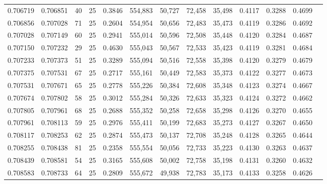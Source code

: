 \begin{tabular}{rrrrrrrrrrrrr}
0.706719 & 0.706851 &    40 &  25 &                                     0.3846 & 554,883 &  50,727 &  72,458 &  35,498 & 0.4117 & 0.3288 & 0.4699 \\
0.706856 & 0.707028 &    71 &  25 &                                     0.2604 & 554,954 &  50,656 &  72,483 &  35,473 & 0.4119 & 0.3286 & 0.4692 \\
0.707028 & 0.707149 &    60 &  25 &                                     0.2941 & 555,014 &  50,596 &  72,508 &  35,448 & 0.4120 & 0.3284 & 0.4687 \\
0.707150 & 0.707232 &    29 &  25 &                                     0.4630 & 555,043 &  50,567 &  72,533 &  35,423 & 0.4119 & 0.3281 & 0.4684 \\
0.707233 & 0.707373 &    51 &  25 &                                     0.3289 & 555,094 &  50,516 &  72,558 &  35,398 & 0.4120 & 0.3279 & 0.4679 \\
0.707375 & 0.707531 &    67 &  25 &                                     0.2717 & 555,161 &  50,449 &  72,583 &  35,373 & 0.4122 & 0.3277 & 0.4673 \\
0.707531 & 0.707671 &    65 &  25 &                                     0.2778 & 555,226 &  50,384 &  72,608 &  35,348 & 0.4123 & 0.3274 & 0.4667 \\
0.707674 & 0.707802 &    58 &  25 &                                     0.3012 & 555,284 &  50,326 &  72,633 &  35,323 & 0.4124 & 0.3272 & 0.4662 \\
0.707805 & 0.707961 &    68 &  25 &                                     0.2688 & 555,352 &  50,258 &  72,658 &  35,298 & 0.4126 & 0.3270 & 0.4655 \\
0.707961 & 0.708113 &    59 &  25 &                                     0.2976 & 555,411 &  50,199 &  72,683 &  35,273 & 0.4127 & 0.3267 & 0.4650 \\
0.708117 & 0.708253 &    62 &  25 &                                     0.2874 & 555,473 &  50,137 &  72,708 &  35,248 & 0.4128 & 0.3265 & 0.4644 \\
0.708255 & 0.708438 &    81 &  25 &                                     0.2358 & 555,554 &  50,056 &  72,733 &  35,223 & 0.4130 & 0.3263 & 0.4637 \\
0.708439 & 0.708581 &    54 &  25 &                                     0.3165 & 555,608 &  50,002 &  72,758 &  35,198 & 0.4131 & 0.3260 & 0.4632 \\
0.708583 & 0.708733 &    64 &  25 &                                     0.2809 & 555,672 &  49,938 &  72,783 &  35,173 & 0.4133 & 0.3258 & 0.4626 \\

\end{tabular}
